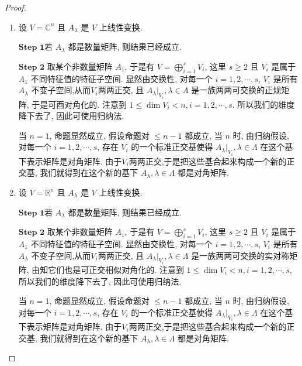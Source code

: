 \documentclass[../../main.tex]{subfiles}
\begin{document}
\begin{proof}
\begin{enumerate}
\item 设 \(V = \mathbb{C}^n\) 且 \(A_{\lambda}\) 是 \(V\) 上线性变换.

$\mathbf{Step}\,\,\mathbf{1}$若 \(A_{\lambda}\) 都是数量矩阵, 则结果已经成立.

$\mathbf{Step}\,\,\mathbf{2}$ 取某个非数量矩阵 \(A_1\), 于是有 \(V = \bigoplus_{i=1}^s V_i\), 这里 \(s \geqslant 2\) 且 \(V_i\) 是属于 \(A_1\) 不同特征值的特征子空间. 显然由交换性, 对每一个 \(i = 1, 2, \cdots, s\), \(V_i\) 是所有 \(A_{\lambda}\) 不变子空间,从而$V_i$两两正交, 且 \(A_{\lambda}|_{V_i}, \lambda \in \Lambda\) 是一族两两可交换的正规矩阵, 于是可酉对角化的. 注意到 \(1 \leqslant \dim V_i < n, i = 1, 2, \cdots, s\). 所以我们的维度降下去了, 因此可使用归纳法.

当 \(n = 1\), 命题显然成立, 假设命题对 \(\leqslant n - 1\) 都成立, 当 \(n\) 时, 由归纳假设, 对每一个 \(i = 1, 2, \cdots, s\), 存在 \(V_i\) 的一个标准正交基使得 \(A_{\lambda}|_{V_i}, \lambda \in \Lambda\) 在这个基下表示矩阵是对角矩阵. 由于$V_i$两两正交,于是把这些基合起来构成一个新的正交基, 我们就得到在这个新的基下 \(A_{\lambda}, \lambda \in \Lambda\) 都是对角矩阵.

\item 设 \(V = \mathbb{R}^n\) 且 \(A_{\lambda}\) 是 \(V\) 上线性变换.

$\mathbf{Step}\,\,\mathbf{1}$若 \(A_{\lambda}\) 都是数量矩阵, 则结果已经成立.

$\mathbf{Step}\,\,\mathbf{2}$ 取某个非数量矩阵 \(A_1\), 于是有 \(V = \bigoplus_{i=1}^s V_i\), 这里 \(s \geqslant 2\) 且 \(V_i\) 是属于 \(A_1\) 不同特征值的特征子空间. 显然由交换性, 对每一个 \(i = 1, 2, \cdots, s\), \(V_i\) 是所有 \(A_{\lambda}\) 不变子空间,从而$V_i$两两正交, 且 \(A_{\lambda}|_{V_i}, \lambda \in \Lambda\) 是一族两两可交换的实对称矩阵, 由知它们也是可正交相似对角化的. 注意到 \(1 \leqslant \dim V_i < n, i = 1, 2, \cdots, s\), 所以我们的维度降下去了, 因此可使用归纳法.

当 \(n = 1\), 命题显然成立, 假设命题对 \(\leqslant n - 1\) 都成立, 当 \(n\) 时, 由归纳假设, 对每一个 \(i = 1, 2, \cdots, s\), 存在 \(V_i\) 的一个标准正交基使得 \(A_{\lambda}|_{V_i}, \lambda \in \Lambda\) 在这个基下表示矩阵是对角矩阵. 由于$V_i$两两正交,于是把这些基合起来构成一个新的正交基, 我们就得到在这个新的基下 \(A_{\lambda}, \lambda \in \Lambda\) 都是对角矩阵.
\end{enumerate}

\end{proof}
\end{document}
